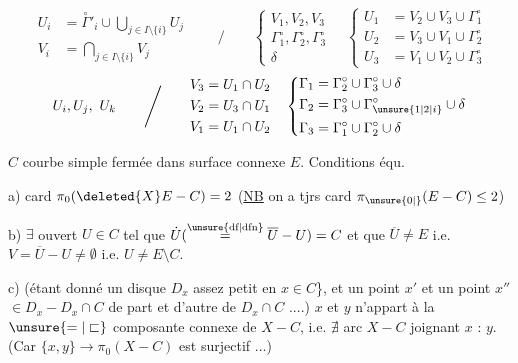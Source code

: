 \[
\begin{aligned}
 U_i&=\overset{\circ}{\Gamma}'_i\cup\bigcup_{j\in I\setminus\{i\}}U_j\\
 V_i&=\bigcap_{j\in I\setminus\{i\}}V_j
\end{aligned}
\qquad\Bigg/\qquad
\left\{\begin{gathered}
 V_1,V_2,V_3\\ \Gamma_1^\circ,\Gamma_2^\circ,\Gamma_3^\circ\\ \delta
\end{gathered}\right.
\quad
\left\{\begin{aligned}
 U_1&=V_2\cup V_3\cup\Gamma_1^\circ\\
 U_2&=V_3\cup V_1\cup\Gamma_2^\circ\\
 U_3&=V_1\cup V_2\cup\Gamma_3^\circ
\end{aligned}\right.
\]
\[
 U_i,U_j,\ U_k\qquad\Bigg/\qquad
\begin{aligned}
 V_3&=U_1\cap U_2\\
 V_2&=U_3\cap U_1\\
 V_1&=U_1\cap U_2
\end{aligned}
\quad
\left\{\begin{aligned}
 \Gamma_1&=\Gamma_2^\circ\cup\Gamma_3^\circ\cup\delta\\
 \Gamma_2&=\Gamma_3^\circ\cup\Gamma_{\unsure{1|2|i}}^\circ\cup\delta\\
 \Gamma_3&=\Gamma_1^\circ\cup\Gamma_2^\circ\cup\delta
\end{aligned}\right.
\]

$C$ courbe simple fermée dans surface connexe $E$. Conditions équ.

a) card $\pi_0(\deleted{X}E-C)=2$ \quad (\uline{NB} on a tjrs card $\pi_{\unsure{0|{}}}(E-C)\le 2$)

b) $\exists$ ouvert $U\in C$ tel que $\dot U(\overset{\text{\unsure{df|dfn}}}{=}\overline U-U)=C$ et que 
$\overline U\ne E$ i.e. $V=\overline U-U\ne\emptyset$ i.e. $U\ne E\setminus C$.

c) (étant donné un disque $D_x$ assez petit  en $x\in C$\}, et un point $x'$ et un point $x''$ $\in D_x-D_x\cap C$ de part et d'autre de $D_x\cap C$ ....)
$x$ et $y$ n'appart  à la $\unsure{=|\sqsubset}$ composante connexe de $X-C$, i.e. $\nexists$ arc  $X-C$ joignant $x$ : $y$.
(Car $\{x,y\}\longrightarrow\pi_0(X-C)$ est surjectif ...)
